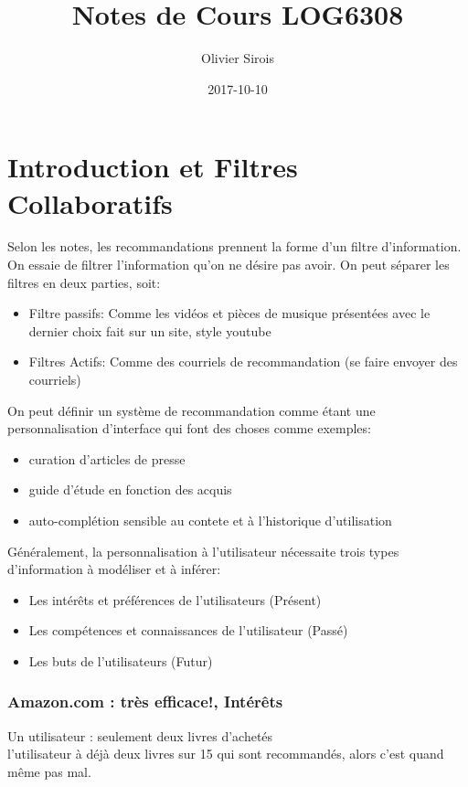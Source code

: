 \documentclass[oneside]{book}
\title{Notes de Cours LOG6308}
\date{2017-10-10}
\author{Olivier Sirois}
\begin{document}
\setcounter{page}{1}
\maketitle
\tableofcontents
\chapter{Introduction et Filtres Collaboratifs}
Selon les notes, les recommandations prennent la forme d'un filtre d'information. On essaie de filtrer l'information qu'on ne désire pas avoir. On peut séparer les filtres en deux parties, soit:
\begin{itemize}
\item Filtre passifs: Comme les vidéos et pièces de musique présentées avec le dernier choix fait sur un site, style youtube
\item Filtres Actifs: Comme des courriels de recommandation (se faire envoyer des courriels)
\end{itemize}

On peut définir un système de recommandation comme étant une personnalisation d'interface qui font des choses comme exemples:
\begin{itemize}
\item curation d'articles de presse
\item guide d'étude en fonction des acquis
\item auto-complétion sensible au contete et à l'historique d'utilisation
\end{itemize}

Généralement, la personnalisation à l'utilisateur nécessaite trois types d'information à modéliser et à inférer:
\begin{itemize}
\item Les intérêts et préférences de l'utilisateurs (Présent)
\item Les compétences et connaissances de l'utilisateur (Passé)
\item Les buts de l'utilisateurs (Futur)
\end{itemize}

\subsection{Amazon.com : très efficace!, Intérêts}
Un utilisateur : seulement deux livres d'achetés\\

l'utilisateur à déjà deux livres sur 15 qui sont recommandés, alors c'est quand même pas mal.\\
\end{document}
